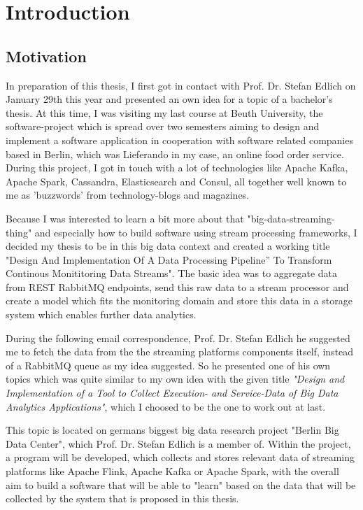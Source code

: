 \chapter{Introduction}

\section{Motivation}

In preparation of this thesis, I first got in contact with Prof. Dr. Stefan Edlich on January
29th this year and presented an own idea for a topic of a bachelor's thesis. At this time,
I was visiting my last course at Beuth University, the software-project which is spread
over two semesters aiming to design and implement a software application in cooperation
with software related companies based in Berlin, which was Lieferando in my case, an
online food order service. During this project, I got in touch with a lot of technologies
like Apache Kafka, Apache Spark, Cassandra, Elasticsearch and Consul, all together well
known to me as 'buzzwords' from technology-blogs and magazines.

Because I was interested to learn a bit more about that "big-data-streaming-thing" and
especially how to build software using stream processing frameworks, I decided my thesis
to be in this big data context and created a working title "Design And Implementation Of
A Data Processing Pipeline” To Transform Continous Monititoring Data Streams". The
basic idea was to aggregate data from REST RabbitMQ endpoints, send this raw data
to a stream processor and create a model which fits the monitoring domain and store this
data in a storage system which enables further data analytics.

During the following email correspondence, Prof. Dr. Stefan Edlich he suggested me to
fetch the data from the the streaming platforms components itself, instead of a RabbitMQ
queue as my idea suggested. So he presented one of his own topics which was quite
similar to my own idea with the given title \textit{"Design and Implementation of a Tool to
Collect Execution- and Service-Data of Big Data Analytics Applications"}, which I choosed to
be the one to work out at last.

This topic is located on germans biggest big data research project "Berlin Big Data Center",
which Prof. Dr. Stefan Edlich is a member of. Within the project, a program will be
developed, which collects and stores relevant data of streaming platforms like Apache
Flink, Apache Kafka or Apache Spark, with the overall aim to build a software that will be
able to "learn" based on the data that will be collected by the system that is proposed in
this thesis.

